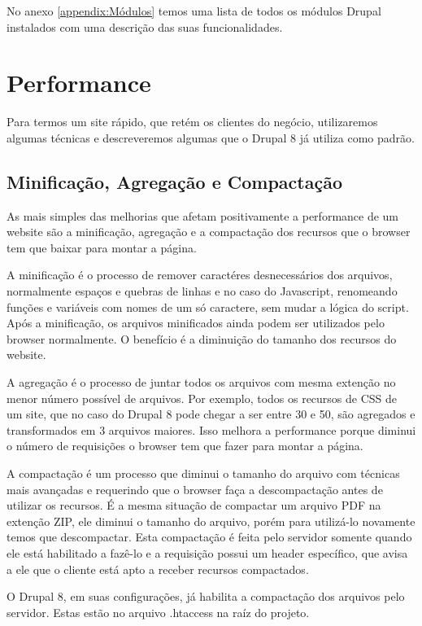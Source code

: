 No anexo \ref{appendix:Módulos} temos uma lista de todos os módulos Drupal instalados com uma descrição das suas funcionalidades.

\section{Performance}

Para termos um site rápido, que retém os clientes do negócio, utilizaremos algumas técnicas e descreveremos algumas que o Drupal 8 já utiliza como padrão.

\subsection{Minificação, Agregação e Compactação}
As mais simples das melhorias que afetam positivamente a performance de um website são a minificação, agregação e a compactação dos recursos que o browser tem que baixar para montar a página. 

A minificação é o processo de remover caractéres desnecessários dos arquivos, normalmente espaços e quebras de linhas e no caso do Javascript, renomeando funções e variáveis com nomes de um só caractere, sem mudar a lógica do script. Após a minificação, os arquivos minificados ainda podem ser utilizados pelo browser normalmente. O benefício é a diminuição do tamanho dos recursos do website.

A agregação é o processo de juntar todos os arquivos com mesma extenção no menor número possível de arquivos. Por exemplo, todos os recursos de CSS de um site, que no caso do Drupal 8 pode chegar a ser entre 30 e 50, são agregados e transformados em 3 arquivos maiores. Isso melhora a performance porque diminui o número de requisições o browser tem que fazer para montar a página.

A compactação é um processo que diminui o tamanho do arquivo com técnicas mais avançadas e requerindo que o browser faça a descompactação antes de utilizar os recursos. É a mesma situação de compactar um arquivo PDF na extenção ZIP, ele diminui o tamanho do arquivo, porém para utilizá-lo novamente temos que descompactar. Esta compactação é feita pelo servidor somente quando ele está habilitado a fazê-lo e a requisição possui  um header específico, que avisa a ele que o cliente está apto a receber recursos compactados.

O Drupal 8, em suas configurações, já habilita a compactação dos arquivos pelo servidor. Estas estão no arquivo .htaccess na raíz do projeto.

